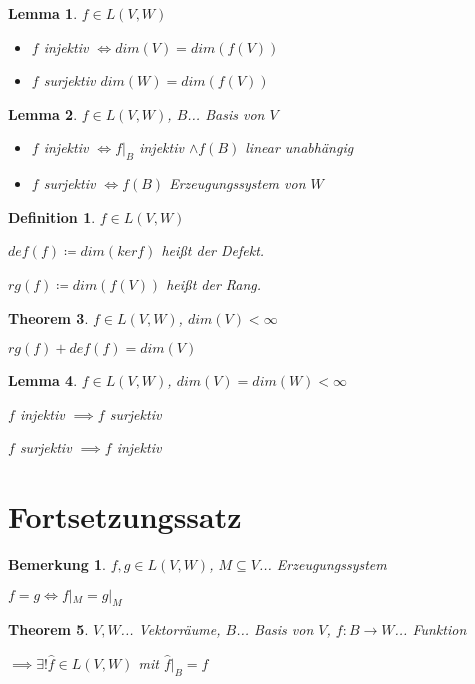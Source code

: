 \documentclass[twocolumn]{article}
\newtheorem{theorem}{Theorem}[section]
\newtheorem{lemma}[theorem]{Lemma}
\newtheorem{definition}{Definition}[section]
\newtheorem*{remark}{Bemerkung}
\newcommand*{\logeq}{\Leftrightarrow}
\begin{document}
\begin{lemma}
	$f \in L(V,W)$
	\begin{itemize}
		\item $f$ injektiv $\logeq dim(V) = dim(f(V))$
		\item $f$ surjektiv $dim(W)=dim(f(V))$
	\end{itemize}
\end{lemma}

\begin{lemma}
	$f \in L(V,W)$, $B$... Basis von $V$
	
	\begin{itemize}
		\item $f$ injektiv $\logeq f|_B$ injektiv $\land f(B)$ linear unabhängig
		\item $f$ surjektiv $\logeq f(B)$ Erzeugungssystem von $W$
	\end{itemize}
\end{lemma}

\begin{definition}
	$f \in L(V,W)$
	
	$def(f)\coloneqq dim(kerf)$ heißt der Defekt.
	
	$rg(f)\coloneqq dim(f(V))$ heißt der Rang.
\end{definition}


\begin{theorem}
	$f \in L(V,W)$, $dim(V)<\infty$
	
	$rg(f)+def(f)=dim(V)$
\end{theorem}

\begin{lemma}
	$f \in L(V,W)$, $dim(V)=dim(W)<\infty$
	
	$f$ injektiv $\implies f$ surjektiv
	
	$f$ surjektiv $\implies f$ injektiv
\end{lemma}

\section{Fortsetzungssatz}

\begin{remark}
	$f,g \in L(V,W)$, $M \subseteq V$... Erzeugungssystem
	
	$f=g \logeq f|_M = g|_M$
\end{remark}

\begin{theorem}
	$V,W$... Vektorräume, $B$... Basis von $V$, $f:B\rightarrow W$... Funktion
	
	$\implies \exists! \hat{f}\in L(V,W)$ mit $\hat{f}|_B = f$
\end{theorem}
\end{document}
